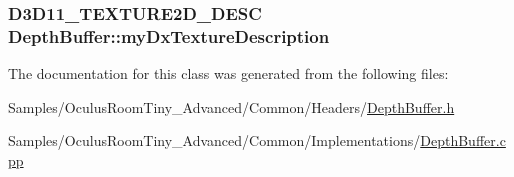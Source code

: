 \subsubsection[{\texorpdfstring{my\+Dx\+Texture\+Description}{myDxTextureDescription}}]{\setlength{\rightskip}{0pt plus 5cm}D3\+D11\+\_\+\+T\+E\+X\+T\+U\+R\+E2\+D\+\_\+\+D\+E\+SC Depth\+Buffer\+::my\+Dx\+Texture\+Description\hspace{0.3cm}{\ttfamily [protected]}}\hypertarget{class_depth_buffer_a217ff5c9e8c6c7609626a81cf704dd1d}{}\label{class_depth_buffer_a217ff5c9e8c6c7609626a81cf704dd1d}


The documentation for this class was generated from the following files\+:\begin{DoxyCompactItemize}
\item 
Samples/\+Oculus\+Room\+Tiny\+\_\+\+Advanced/\+Common/\+Headers/\hyperlink{_depth_buffer_8h}{Depth\+Buffer.\+h}\item 
Samples/\+Oculus\+Room\+Tiny\+\_\+\+Advanced/\+Common/\+Implementations/\hyperlink{_depth_buffer_8cpp}{Depth\+Buffer.\+cpp}\end{DoxyCompactItemize}

